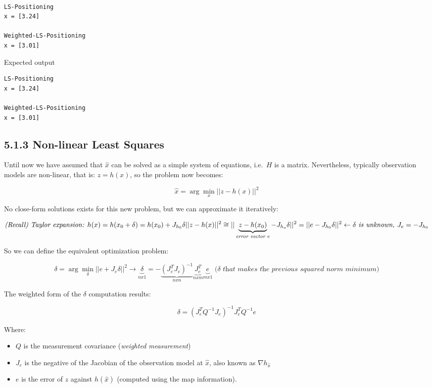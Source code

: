 \documentclass[11pt]{article}
\providecommand{\tightlist}{%
      \setlength{\itemsep}{0pt}\setlength{\parskip}{0pt}}
\begin{document}
    \begin{Verbatim}[commandchars=\\\{\}]

LS-Positioning
x = [3.24]

Weighted-LS-Positioning
x = [3.01]
    \end{Verbatim}

    {Expected output}

\begin{verbatim}
LS-Positioning
x = [3.24]

Weighted-LS-Positioning
x = [3.01]
\end{verbatim}

    \hypertarget{non-linear-least-squares}{%
\subsection{5.1.3 Non-linear Least
Squares}\label{non-linear-least-squares}}

Until now we have assumed that \(\hat{x}\) can be solved as a simple
system of equations, i.e.~\(H\) is a matrix. Nevertheless, typically
observation models are non-linear, that is: \(z = h(x)\), so the problem
now becomes:

\[
  \hat x = \arg\min_x ||z-h(x)||^2
  \]

No close-form solutions exists for this new problem, but we can
approximate it iteratively:

\[ 
  \textit{(Recall) Taylor expansion: } h(x) = h(x_0+\delta) = h(x_0) + J_{h_0}\delta \\
  ||z-h(x)||^2 \cong ||\underbrace{z-h(x_0)}_{\textit{error vector $e$}}-J_{h_o}\delta||^2 = ||e-J_{h_0}\delta||^2 \leftarrow \textit{$\delta$ is unknown, $J_e=-J_{h_0}$}\]

So we can define the equivalent optimization problem:

\[
  \delta = \arg\min_\delta ||e + J_e \delta||^2 \rightarrow \underbrace{\delta}_{nx1} = -\underbrace{(J_e^T J_e)^{-1}}_{nxn}\underbrace{J_e^T}_{nxm} \underbrace{e}_{mx1} \textit{ ($\delta$ that makes the previous squared norm minimum)}
  \]

The weighted form of the \(\delta\) computation results:

\[
  \delta = (J_e^T Q^{-1} J_e)^{-1}J_e^T Q^{-1} e
  \]

Where:

\begin{itemize}
\tightlist
\item
  \(Q\) is the measurement covariance (\emph{weighted measurement})
\item
  \(J_e\) is the negative of the Jacobian of the observation model at
  \(\hat{x}\), also known as \(\nabla h_{\hat{x}}\)
\item
  \(e\) is the error of \(z\) against \(h(\hat{x})\) (computed using the
  map information).
\end{itemize}
\end{document}
